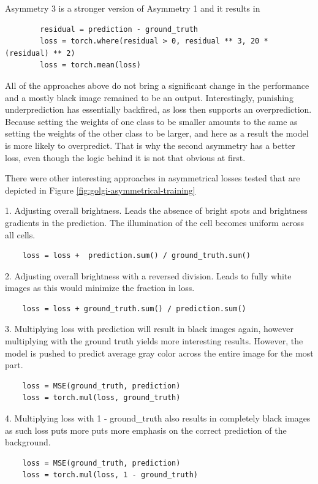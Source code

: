 Asymmetry 3 is a stronger version of Asymmetry 1 and it results in 
	\begin{lstlisting}
		residual = prediction - ground_truth
		loss = torch.where(residual > 0, residual ** 3, 20 * (residual) ** 2)
		loss = torch.mean(loss)
	  \end{lstlisting}

All of the approaches above do not bring a significant change in the performance and a mostly black image remained to be an output. Interestingly, punishing underprediction has essentially backfired, as loss then supports an overprediction. Because setting the weights of one class to be smaller amounts to the same as setting the weights of the other class to be larger, and here as a result the model is more likely to overpredict. That is why the second asymmetry has a better loss, even though the logic behind it is not that obvious at first. 

There were other interesting approaches in asymmetrical losses tested that are depicted in Figure \ref{fig:golgi-asymmetrical-training}

1. Adjusting overall brightness. Leads the absence of bright spots and brightness gradients in the prediction. The illumination of the cell becomes uniform across all cells.
\begin{lstlisting}
	loss = loss +  prediction.sum() / ground_truth.sum()
  \end{lstlisting}

2. Adjusting overall brightness with a reversed division. Leads to fully white images as this would minimize the fraction in loss.
\begin{lstlisting}
	loss = loss + ground_truth.sum() / prediction.sum()
\end{lstlisting}

3. Multiplying loss with prediction will result in black images again, however multiplying with the ground truth yields more interesting results. However, the model is pushed to predict average gray color across the entire image for the most part.

\begin{lstlisting}
	loss = MSE(ground_truth, prediction)
	loss = torch.mul(loss, ground_truth)
\end{lstlisting}

4. Multiplying loss with 1 - ground\_truth also results in completely black images as such loss puts more puts more emphasis on the correct prediction of the background.
\begin{lstlisting}
	loss = MSE(ground_truth, prediction)
	loss = torch.mul(loss, 1 - ground_truth)
\end{lstlisting}

